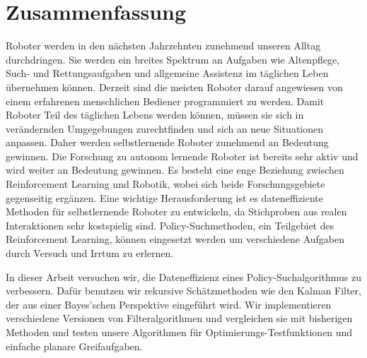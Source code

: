 
\chapter*{Zusammenfassung}
Roboter werden in den nächsten Jahrzehnten zunehmend unseren
Alltag durchdringen. Sie werden ein breites Spektrum an
Aufgaben wie Altenpflege, Such- und Rettungsaufgaben und allgemeine
Assistenz im täglichen Leben übernehmen können.
Derzeit sind die meisten Roboter darauf angewiesen von einem
erfahrenen menschlichen Bediener programmiert zu werden.
Damit Roboter Teil des täglichen Lebens werden können, müssen sie
sich in verändernden Umgegebungen zurechtfinden und sich an
neue Situationen anpassen.
Daher werden selbstlernende Roboter zunehmend an Bedeutung gewinnen.
Die Forschung zu autonom lernende Roboter ist
bereits sehr aktiv und wird weiter an Bedeutung gewinnen.
Es besteht eine enge Beziehung zwischen Reinforcement Learning und
Robotik, wobei sich beide Forschungsgebiete gegenseitig ergänzen.
Eine wichtige Herausforderung ist es dateneffiziente Methoden
für selbstlernende Roboter zu entwickeln, da Stichproben
aus realen Interaktionen sehr kostspielig sind.
Policy-Suchmethoden, ein Teilgebiet des Reinforcement Learning,
können eingesetzt werden um verschiedene Aufgaben durch Versuch und Irrtum
zu erlernen.

In dieser Arbeit versuchen wir, die Dateneffizienz eines
Policy-Suchalgorithmus zu verbessern.
Dafür benutzen wir rekursive Schätzmethoden wie den Kalman
Filter, der aus einer Bayes'schen Perspektive eingeführt wird.
Wir implementieren verschiedene Versionen von Filteralgorithmen
und vergleichen sie mit bisherigen Methoden
und testen unsere Algorithmen für Optimierungs-Testfunktionen und einfache
planare Greifaufgaben.

